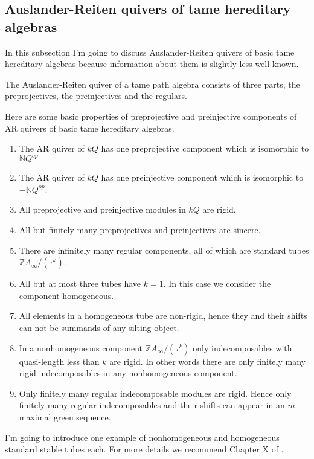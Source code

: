 \subsection{Auslander-Reiten quivers of tame hereditary algebras}
\indent In this subsection I'm going to discuss Auslander-Reiten quivers of basic tame hereditary algebras because information about them is slightly less well known.\\
\begin{theorem}
\indent \cite{DR76} The Auslander-Reiten quiver of a tame path algebra consists of three parts, the preprojectives, the preinjectives and the regulars.
\end{theorem}
\indent Here are some basic properties of preprojective and preinjective components of AR quivers of basic tame hereditary algebras.
\begin{theorem}
\begin{enumerate}
\item The AR quiver of $kQ$ has one preprojective component which is isomorphic to $\mathbb{N}Q^{op}$
\item The AR quiver of $kQ$ has one preinjective component which is isomorphic to $-\mathbb{N}Q^{op}$.
\item All preprojective and preinjective modules in $kQ$ are rigid.
\item All but finitely many preprojectives and preinjectives are sincere.
\item There are infinitely many regular components, all of which are standard tubes $\mathbb{Z}A_{\infty}/(\tau^k)$.
\item All but at most three tubes have $k=1$. In this case we consider the component homogeneous.
\item All elements in a homogeneous tube are non-rigid, hence they and their shifts can not be summands of any silting object.
\item In a nonhomogeneous component $\mathbb{Z}A_{\infty}/(\tau^k)$ only indecomposables with quasi-length less than $k$ are rigid. In other words there are only finitely many rigid indecomposables in any nonhomogeneous component.
\item Only finitely many regular indecomposable modules are rigid. Hence only finitely many regular indecomposables and their shifts can appear in an $m$-maximal green sequence.
\end{enumerate}
\end{theorem}
\indent I'm going to introduce one example of nonhomogeneous and homogeneous standard stable tubes each. For more details we recommend Chapter X of \cite{SS06}.\\
